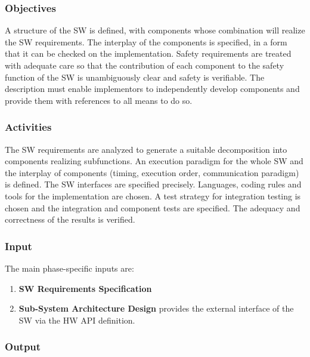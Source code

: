 \documentclass{template/openetcs_article}
\begin{document}
\subsubsection{Objectives}
\label{sec:4-objectives}

A structure of the SW is defined, with components whose combination
will realize the SW requirements. The interplay of the components is
specified, in a form that it can be checked on the
implementation. Safety requirements are treated with adequate care so
that the contribution of each component to the safety function of the
SW is unambiguously clear and safety is verifiable. The description
must enable implementors to independently develop components and
provide them with references to all means to do so.

\subsubsection{Activities}
\label{sec:4-activities}

The SW requirements are analyzed to generate a suitable decomposition
into components realizing subfunctions. An execution paradigm for the
whole SW and the interplay of components (timing, execution order,
communication paradigm) is defined. The SW interfaces are specified
precisely. Languages, coding rules and tools for the implementation
are chosen. A test strategy for integration testing is chosen and the
integration and component tests are specified. The adequacy and
correctness of the results is verified.


\subsubsection{Input}
\label{sec:4-input}

The main phase-specific inputs are:
\begin{enumerate}
\item \textbf{SW Requirements Specification}
\item \textbf{Sub-System Architecture Design} provides the external
  interface of the SW via the HW API definition.
\end{enumerate}

\subsubsection{Output}
\label{sec:4-output}
\end{document}
